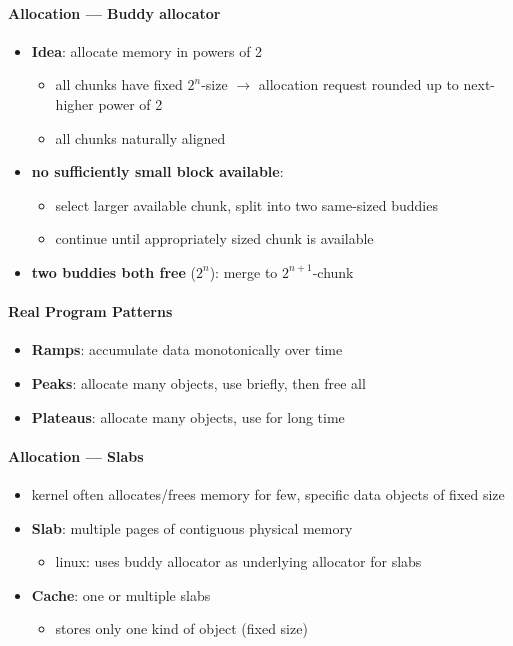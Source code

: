 \paragraph{Allocation --- Buddy allocator}
\begin{itemize}
  \item \textbf{Idea}: allocate memory in powers of 2
  \begin{itemize}
    \item all chunks have fixed $ 2^n $-size $ \to $ allocation request rounded up to next-higher power of 2
    \item all chunks naturally aligned
  \end{itemize}
  \item \textbf{no sufficiently small block available}:
  \begin{itemize}
    \item select larger available chunk, split into two same-sized buddies
    \item continue until appropriately sized chunk is available
  \end{itemize}
  \item \textbf{two buddies both free} ($ 2^n $): merge to $ 2^{n+1} $-chunk
\end{itemize}

\paragraph{Real Program Patterns}
\begin{itemize}
  \item \textbf{Ramps}: accumulate data monotonically over time
  \item \textbf{Peaks}: allocate many objects, use briefly, then free all
  \item \textbf{Plateaus}: allocate many objects, use for long time
\end{itemize}

\paragraph{Allocation --- Slabs}
\begin{itemize}
  \item kernel often allocates/frees memory for few, specific data objects of fixed size
  \item \textbf{Slab}: multiple pages of contiguous physical memory
  \begin{itemize}
    \item linux: uses buddy allocator as underlying allocator for slabs
  \end{itemize}
  \item \textbf{Cache}: one or multiple slabs
  \begin{itemize}
    \item stores only one kind of object (fixed size)
  \end{itemize}
\end{itemize}

